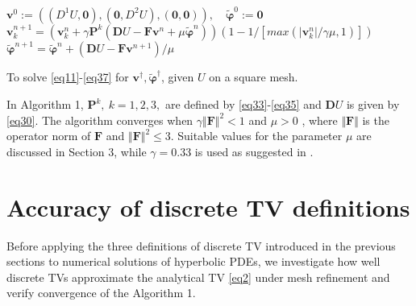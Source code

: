 \documentclass[reqno,a4paper,12pt]{amsart}
\begin{document}
\begin{algorithm}
\begin{algorithmic}[h]
\State $\bm{v}^0 := ((D^1U,\bm{0}),(\bm{0},D^2U),(\bm{0},\bm{0})), \quad \widetilde{\bm{\varphi}}^0 := \bm{0}$
\State $\bm{v}^{n+1}_k = (\bm{v}^{n}_k + \gamma \bm P^k (\bm{D}U - \bm F \bm{v}^n +\mu {\widetilde{\bm{\varphi}}}^n) ) (1 - 1/[max(\vert \bm{v}^n_k \vert / \gamma \mu,1)])$ \;
\State $\widetilde{\bm{\varphi}}^{n+1} = \widetilde{\bm{\varphi}}^{n} + (\bm{D}U -\bm F\bm{v}^{n+1}) / \mu$ 
\EndFor
\EndWhile
\end{algorithmic}
\caption{To solve \eqref{eq11}-\eqref{eq37} for $\bm{v}^{\dagger}, \widetilde{\bm{\varphi}}^{\dagger}$, given $U$ on a square mesh.}
\end{algorithm}
In Algorithm 1, $\bm P^k, ~k = 1,2,3,$ are defined by \eqref{eq33}-\eqref{eq35} and $\bm{D} U$ is given by \eqref{eq30}. The algorithm converges when $\gamma \Vert \bm F \Vert^2 < 1$ and $\mu > 0$  \cite{ChambollePock}, where $\Vert \bm F \Vert$ is the operator norm of $\bm F$ and $\Vert \bm F \Vert^2 \leq 3$. Suitable values for the parameter $\mu$ are discussed in Section 3, while $\gamma = 0.33$ is used as suggested in \cite{Condat}. 


\section{Accuracy of discrete TV definitions}

Before applying the three definitions of discrete TV introduced in the previous sections to numerical solutions of hyperbolic PDEs, we investigate how well discrete TVs approximate the analytical TV \eqref{eq2} under mesh refinement and verify convergence of the Algorithm 1.
\end{document}
